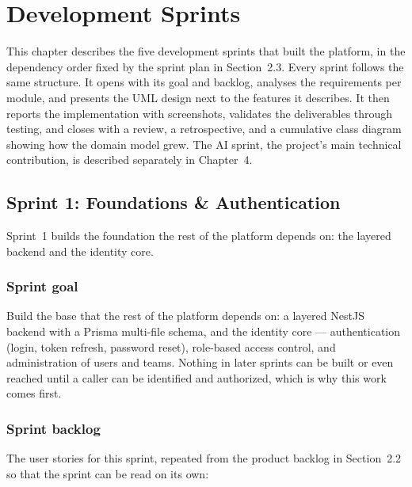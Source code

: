 
\chapter{Development Sprints}

This chapter describes the five development sprints that built the platform, in the dependency
order fixed by the sprint plan in Section~2.3. Every sprint follows the same structure. It
opens with its goal and backlog, analyses the requirements per module, and presents the UML
design next to the features it describes. It then reports the implementation with screenshots,
validates the deliverables through testing, and closes with a review, a retrospective, and a
cumulative class diagram showing how the domain model grew. The AI sprint, the project's main
technical contribution, is described separately in Chapter~4.


\clearpage
\section{Sprint 1: Foundations \& Authentication}

Sprint~1 builds the foundation the rest of the platform depends on: the layered backend and the
identity core.

\subsection{Sprint goal}

Build the base that the rest of the platform depends on: a layered NestJS backend with a
Prisma multi-file schema, and the identity core --- authentication (login, token refresh,
password reset), role-based access control, and administration of users and teams. Nothing in
later sprints can be built or even reached until a caller can be identified and authorized,
which is why this work comes first.

\subsection{Sprint backlog}

The user stories for this sprint, repeated from the product backlog in Section~2.2 so that the
sprint can be read on its own:

